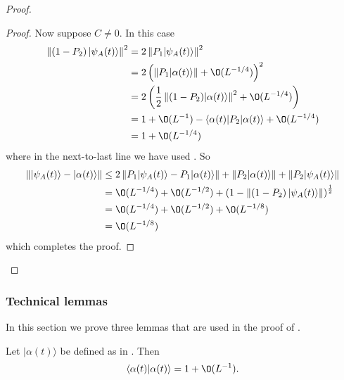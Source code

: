 \documentclass[../thesis-main/thesis-main]{subfiles}
\begin{document}
\begin{proof}
\begin{proof}
Now suppose $C\neq0$. In this case
\begin{align*}
\left\Vert \left(1-P_{2}\right)|\psi_{A}(t)\rangle\right\Vert ^{2} & = 2\left\Vert P_{1}|\psi_{A}(t)\rangle\right\Vert ^{2}\\
 & = 2\left(\left\Vert P_{1}|\alpha(t)\rangle\right\Vert +\O(L^{-{1}/{4}})\right)^2\\
 & = 2\left(\frac{1}{2}\left\Vert (1-P_{2})|\alpha(t)\rangle\right\Vert ^{2}+\O(L^{-{1}/{4}})\right)\\
 & = 1+\O(L^{-1})-\langle\alpha(t)|P_{2}|\alpha(t)\rangle+\O(L^{-{1}/{4}})\\
 & = 1+\O(L^{-{1}/{4}})
\end{align*}
where in the next-to-last line we have used . So
\begin{align*}
\left\Vert |\psi_{A}(t)\rangle-|\alpha(t)\rangle\right\Vert  & \leq 2\left\Vert P_{1}|\psi_{A}(t)\rangle-P_{1}|\alpha(t)\rangle\right\Vert +\left\Vert P_{2}|\alpha(t)\rangle\right\Vert +\left\Vert P_{2}|\psi_{A}(t)\rangle\right\Vert \\
 & = \O(L^{-{1}/{4}})+\O(L^{-{1}/{2}})+\left(1-\left\Vert \left(1-P_{2}\right)|\psi_{A}(t)\rangle\right\Vert \right)^{\frac{1}{2}}\\
 & = \O(L^{-{1}/{4}})+\O(L^{-{1}/{2}})+\O(L^{-{1}/{8}})\\
 & = \O(L^{-{1}/{8}})
 \end{align*}
which completes the proof. 
\end{proof}
\end{proof}


\subsubsection{Technical lemmas}
\label{sec:techlem}

In this section we prove three lemmas that are used in the proof of .

\begin{lemma} \label{lem:alpha}
Let $|\alpha(t)\rangle$ be defined as in .
Then
\[
\langle\alpha(t)|\alpha(t)\rangle=1+\O(L^{-1}).
\]
\end{lemma}
\end{document}
